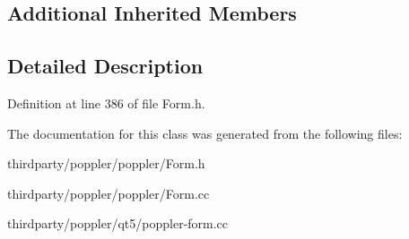 \subsection*{Additional Inherited Members}


\subsection{Detailed Description}


Definition at line 386 of file Form.\+h.



The documentation for this class was generated from the following files\+:\begin{DoxyCompactItemize}
\item 
thirdparty/poppler/poppler/Form.\+h\item 
thirdparty/poppler/poppler/Form.\+cc\item 
thirdparty/poppler/qt5/poppler-\/form.\+cc\end{DoxyCompactItemize}

